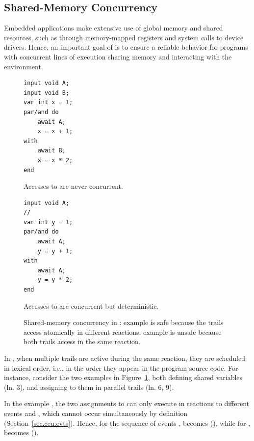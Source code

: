 \subsection{Shared-Memory Concurrency}

Embedded applications make extensive use of global memory and shared resources,
such as through memory-mapped registers and system calls to device drivers.
Hence, an important goal of \CEU is to ensure a reliable behavior for programs
with concurrent lines of execution sharing memory and interacting with the
environment.

\begin{figure}[h]
\begin{minipage}[h]{0.45\linewidth}
\begin{lstlisting}[numbers=right]
input void A;
input void B;
var int x = 1;
par/and do
    await A;
    x = x + 1;
with
    await B;
    x = x * 2;
end
\end{lstlisting}
\centering\small{\ax Accesses to  are never concurrent.}
\end{minipage}
%
\begin{minipage}[h]{0.53\linewidth}
\begin{lstlisting}[xleftmargin=2em]
input void A;
//
var int y = 1;
par/and do
    await A;
    y = y + 1;
with
    await A;
    y = y * 2;
end

\end{lstlisting}
\centering\small{\bx Accesses to  are concurrent but deterministic.}
\end{minipage}
\caption{ Shared-memory concurrency in \CEU:
example \ax is safe because the trails access  atomically in different
reactions;
example \bx is unsafe because both trails access  in the same reaction.
\label{lst.shared}
}
\end{figure}

In \CEU, when multiple trails are active during the same reaction, they are
scheduled in lexical order, i.e., in the order they appear in the program
source code.
%
For instance, consider the two examples in Figure~\ref{lst.shared}, both
defining shared variables (ln. 3), and assigning to them in parallel trails
(ln. 6, 9).

In the example \ax, the two assignments to  can only execute in
reactions to different events  and , which cannot occur
simultaneously by definition (Section~\ref{sec.ceu.evts}).
Hence, for the sequence of events ,  becomes 
(), while for ,  becomes 
().


